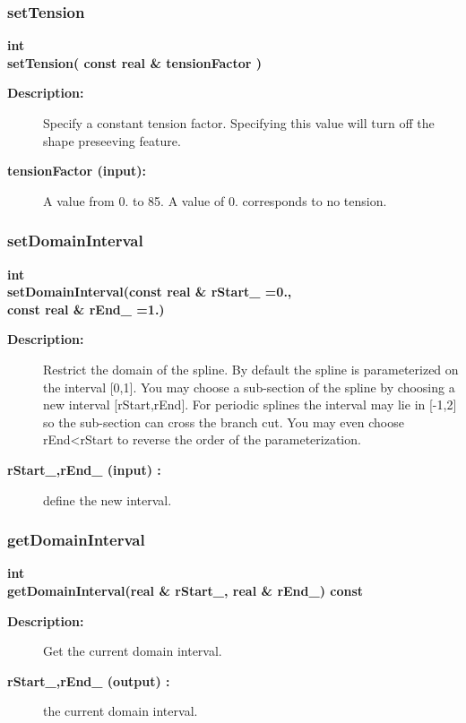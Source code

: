 \subsubsection{setTension}
 
\begin{flushleft} \textbf{%
int   \\ 
\settowidth{\SplineMappingIncludeArgIndent}{setTension(}%
setTension( const real \& tensionFactor )
}\end{flushleft}
\begin{description}
\item[{\bf Description:}] 
   Specify a constant tension factor. Specifying this value will turn off the shape preseeving feature.
\item[{\bf tensionFactor (input):}]  A value from 0. to 85. A value of 0. corresponds to no tension.

\end{description}
\subsubsection{setDomainInterval}
 
\begin{flushleft} \textbf{%
int   \\ 
\settowidth{\SplineMappingIncludeArgIndent}{setDomainInterval(}%
setDomainInterval(const real \& rStart\_  =0., \\ 
\hspace{\SplineMappingIncludeArgIndent}const real \& rEnd\_  =1.)
}\end{flushleft}
\begin{description}
\item[{\bf Description:}] 
 Restrict the domain of the spline.
 By default the spline is parameterized on the interval [0,1].
 You may choose a sub-section of the spline by choosing a new interval [rStart,rEnd].
 For periodic splines the interval may lie in [-1,2] so the sub-section can cross the branch cut.
 You may even choose rEnd<rStart to reverse the order of the parameterization.
\item[{\bf rStart\_,rEnd\_ (input) :}]  define the new interval.
\end{description}
\subsubsection{getDomainInterval}
 
\begin{flushleft} \textbf{%
int   \\ 
\settowidth{\SplineMappingIncludeArgIndent}{getDomainInterval(}%
getDomainInterval(real \& rStart\_, real \& rEnd\_) const
}\end{flushleft}
\begin{description}
\item[{\bf Description:}] 
  Get the current domain interval.
\item[{\bf rStart\_,rEnd\_ (output) :}]  the current domain interval.
\end{description}
